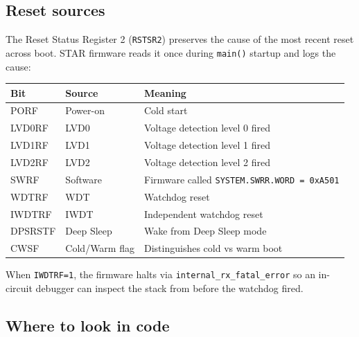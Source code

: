 \subsection{Reset sources}

The Reset Status Register 2 (\texttt{RSTSR2}) preserves the cause of
the most recent reset across boot. STAR firmware reads it once during
\texttt{main()} startup and logs the cause:

\begin{center}
\begin{tabular}{|l|l|p{6cm}|}
\hline
\textbf{Bit} & \textbf{Source} & \textbf{Meaning}                                                            \\
\hline
PORF         & Power-on        & Cold start                                                                  \\
LVD0RF       & LVD0            & Voltage detection level 0 fired                                              \\
LVD1RF       & LVD1            & Voltage detection level 1 fired                                              \\
LVD2RF       & LVD2            & Voltage detection level 2 fired                                              \\
SWRF         & Software        & Firmware called \texttt{SYSTEM.SWRR.WORD = 0xA501}                          \\
WDTRF        & WDT             & Watchdog reset                                                              \\
IWDTRF       & IWDT            & Independent watchdog reset                                                  \\
DPSRSTF      & Deep Sleep      & Wake from Deep Sleep mode                                                   \\
CWSF         & Cold/Warm flag  & Distinguishes cold vs warm boot                                              \\
\hline
\end{tabular}
\end{center}

When \texttt{IWDTRF=1}, the firmware halts via
\texttt{internal\_rx\_fatal\_error} so an in-circuit debugger can
inspect the stack from before the watchdog fired.

\subsection{Where to look in code}

